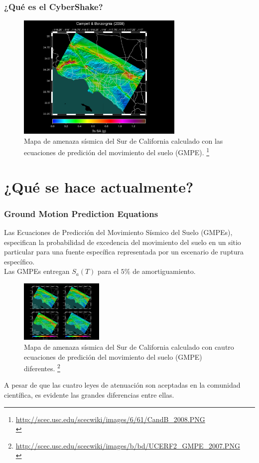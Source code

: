 \documentclass{beamer}
\begin{document}
\begin{frame}
\frametitle{¿Qué es el CyberShake?}
%
\begin{figure}[h]
	\centering
	\includegraphics[height=6cm]{img/CandB_2008.pdf}
	\caption{Mapa de amenaza sísmica del Sur de California calculado con las ecuaciones de predición del movimiento del suelo (GMPE). \footnote{\tiny \url{http://scec.usc.edu/scecwiki/images/6/61/CandB_2008.PNG}\\}}
\end{figure}
%
%
%
\end{frame}
%
%
\section{¿Qué se hace actualmente?}
\begin{frame}[allowframebreaks]\frametitle{Ground Motion Prediction Equations}
%
\justifying
Las Ecuaciones de Predicción del Movimiento Sísmico del Suelo (GMPEs), especifican la probabilidad de excedencia del movimiento del suelo en un sitio particular para una fuente específica representada por un escenario de ruptura específico.\\
%
Las GMPEs entregan $S_a \left( T \right)$ para el $5\%$ de amortiguamiento.
%
\begin{figure}[h]
	\centering
	\includegraphics[height=3cm]{img/UCERF2_GMPE_2007.pdf}
	\caption{Mapa de amenaza sísmica del Sur de California calculado con cautro ecuaciones de predición del movimiento del suelo (GMPE) diferentes. \footnote{ \tiny\url{http://scec.usc.edu/scecwiki/images/b/bd/UCERF2_GMPE_2007.PNG}\\}}
\end{figure}
%
\justifying
A pesar de que las cuatro leyes de atenuación son aceptadas en la comunidad científica, es evidente las grandes diferencias entre ellas.\\
%
%
\end{frame}
%
%
\end{document}
